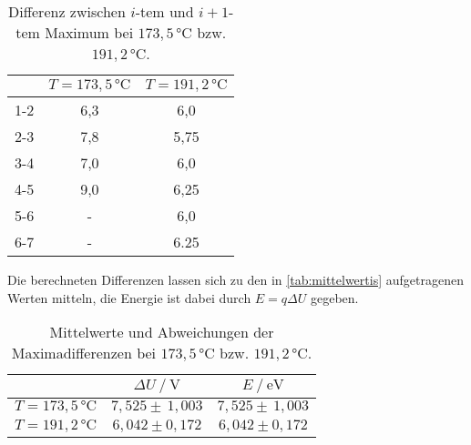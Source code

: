 \begin{table}[H]
    \centering
    \caption{Differenz zwischen $i$-tem und $i + 1$-tem Maximum bei $173,5 \,\unit{\celsius}$ bzw. $191,2 \,\unit{\celsius}$.}
    \label{tab:messung2diffs}
    \begin{tabular}{S[table-format = 1.1] S[table-format = 2.3] S[table-format = 2.3]}
      \toprule
      {} & {$T = 173,5 \,\unit{\celsius}$} & {$T = 191,2 \,\unit{\celsius}$}\\
      \midrule
        {1-2}               &           {6,3}           &           {6,0}              \\
        {2-3}               &           {7,8}           &           {5,75}           \\
        {3-4}               &           {7,0}           &           {6,0}            \\
        {4-5}               &           {9,0}           &           {6,25}           \\
        {5-6}               &           {-}             &           {6,0}            \\
        {6-7}               &           {-}             &           {6.25}           \\
      \bottomrule
    \end{tabular}
\end{table}

Die berechneten Differenzen lassen sich zu den in \autoref{tab:mittelwertis} aufgetragenen Werten mitteln, die Energie ist dabei durch
$E = q \Delta U$ gegeben.

\begin{table}[H]
    \centering
    \caption{Mittelwerte und Abweichungen der Maximadifferenzen bei $173,5 \,\unit{\celsius}$ bzw. $191,2 \,\unit{\celsius}$.}
    \label{tab:mittelwertis}
    \begin{tabular}{S[table-format = 1.1] S[table-format = 2.3] S[table-format = 2.3]}
      \toprule
      {} & {$\Delta U \mathbin{/} \unit{\volt}$} & {$E \mathbin{/} \unit{\eV}$}\\
      \midrule
       {$T = 173,5 \,\unit{\celsius}$}      &     {$  7,525 \pm \, 1,003$}   & {$  7,525 \pm \, 1,003$} \\
       {$T = 191,2 \,\unit{\celsius}$}      & 	  {$ 6,042 \pm 0,172 $}       & {$6,042 \pm 0,172      $} \\
      \bottomrule
    \end{tabular}
\end{table}

